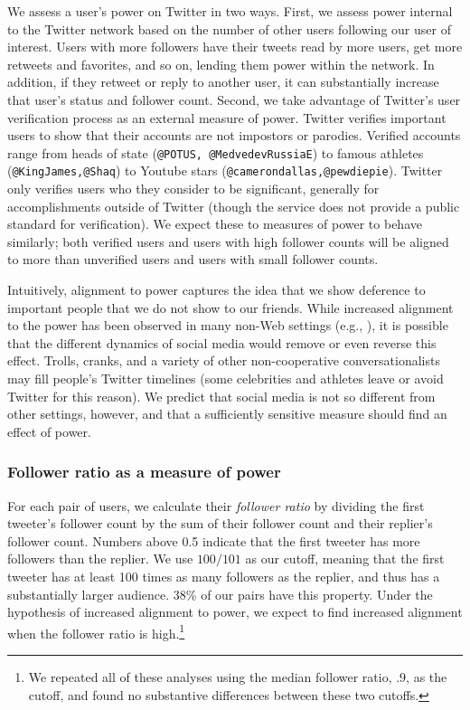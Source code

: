 \documentclass{acm_proc_article-sp}
\begin{document}
We assess a user's power on Twitter in two ways. First, we assess power internal to the Twitter network based on the number of other users following our user of interest.  Users with more followers have their tweets read by more users, get more retweets and favorites, and so on, lending them power within the network.  In addition, if they retweet or reply to another user, it can substantially increase that user's status and follower count.  Second, we take advantage of Twitter's user verification process as an external measure of power.  Twitter verifies important users to show that their accounts are not impostors or parodies.  Verified accounts range from heads of state (\texttt{@POTUS, @MedvedevRussiaE}) to famous athletes (\texttt{@KingJames,@Shaq}) to Youtube stars (\texttt{@camerondallas,@pewdiepie}). Twitter only verifies users who they consider to be significant, generally for accomplishments outside of Twitter (though the service does not provide a public standard for verification).  We expect these to measures of power to behave similarly; both verified users and users with high follower counts will be aligned to more than unverified users and users with small follower counts.

Intuitively, alignment to power captures the idea that we show deference to important people that we do not show to our friends. While increased alignment to the power has been observed in many non-Web settings (e.g., \cite{guo2015}), it is possible that the different dynamics of social media would remove or even reverse this effect.  Trolls, cranks, and a variety of other non-cooperative conversationalists may fill people's Twitter timelines (some celebrities and athletes leave or avoid Twitter for this reason). We predict that social media is not so different from other settings, however, and that a sufficiently sensitive measure should find an effect of power.

\subsubsection{Follower ratio as a measure of power} 

For each pair of users, we calculate their \textit{follower ratio} by dividing the first tweeter's follower count by the sum of their follower count and their replier's follower count.  Numbers above 0.5 indicate that the first tweeter has more followers than the replier.  We use $100/101$ as our cutoff, meaning that the first tweeter has at least 100 times as many followers as the replier, and thus has a substantially larger audience. 38\% of our pairs have this property.  Under the hypothesis of increased alignment to power, we expect to find increased alignment when the follower ratio is high.\footnote{We repeated all of these analyses using the median follower ratio, $.9$, as the cutoff, and found no substantive differences between these two cutoffs.}
\end{document}

